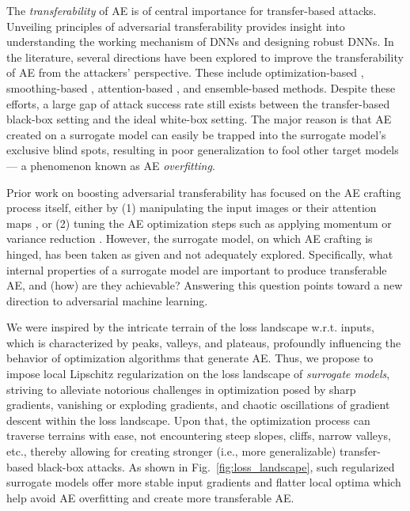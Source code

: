 \documentclass[letterpaper]{article} %
\theoremstyle{plain}
\theoremstyle{definition}
\newcommand{\fref}[1]{Fig.~\ref{#1}}
\newcommand{\red}[1]{\textcolor{red}{[#1]}}
\newcommand{\blue}[1]{\textcolor{blue}{[#1]}}
\begin{document}
The \emph{transferability} of AE is of central importance for transfer-based attacks. Unveiling principles of adversarial transferability provides insight into understanding the working mechanism of DNNs and designing robust DNNs. In the literature, several directions have been explored to improve the transferability of AE from the attackers' perspective. These include optimization-based \cite{dong2018boosting,lin2020nesterov}, smoothing-based \cite{dong2019evading,xie2019improving,wu2019skip,guo2020backpropagating}, attention-based \cite{wu2020boosting}, and ensemble-based \cite{li2020learning} methods. Despite these efforts, a large gap of attack success rate still exists between the transfer-based black-box setting and the ideal white-box setting. The major reason is that AE created on a surrogate model can easily be trapped into the surrogate model's exclusive blind spots, resulting in poor generalization to fool other target models --- a phenomenon known as AE \emph{overfitting}.


Prior work on boosting adversarial transferability has focused on the AE crafting process itself, either by (1) manipulating the input images \cite{xie2019improving} or their attention maps \cite{inkawhich2019feature}, or (2) tuning the AE optimization steps such as applying momentum \cite{dong2018boosting} or variance reduction \cite{xiong2022stochastic}. However, the surrogate model, on which AE crafting is hinged, has been taken as given and not adequately explored. Specifically, what internal properties of a surrogate model are important to produce transferable AE, and (how) are they achievable? Answering this question points toward a new direction to adversarial machine learning.

We were inspired by the intricate terrain of the loss landscape w.r.t. inputs, which is characterized by peaks, valleys, and plateaus, profoundly influencing the behavior of optimization algorithms that generate AE. Thus, we propose to impose local Lipschitz regularization on the loss landscape of {\em surrogate models}, striving to alleviate notorious challenges in optimization posed by sharp gradients, vanishing or exploding gradients, and chaotic oscillations of gradient descent within the loss landscape. %
Upon that, the optimization process can traverse terrains with ease, not encountering steep slopes, cliffs, narrow valleys, etc., thereby allowing for creating stronger (i.e., more generalizable) transfer-based black-box attacks. As shown in \fref{fig:loss_landscape}, such regularized surrogate models offer more stable input gradients and flatter local optima which help avoid AE overfitting and create more transferable AE.%
\end{document}
